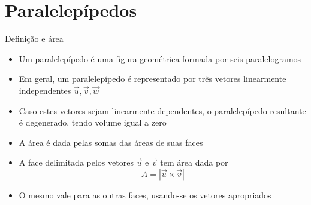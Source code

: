 \section{Paralelepípedos}

\begin{frame}[fragile]{Definição e área}

    \begin{itemize}
        \item Um paralelepípedo é uma figura geométrica formada por seis paralelogramos

        \item Em geral, um paralelepípedo é representado por três vetores linearmente 
            independentes $\vec{u}, \vec{v}, \vec{w}$

        \item Caso estes vetores sejam linearmente dependentes, o paralelepípedo resultante
            é degenerado, tendo volume igual a zero

        \item A área é dada pelas somas das áreas de suas faces

        \item A face delimitada pelos vetores $\vec{u}$ e $\vec{v}$ tem área dada por
        \[
            A = |\vec{u} \times \vec{v}|
        \]

        \item O mesmo vale para as outras faces, usando-se os vetores apropriados
    \end{itemize}

\end{frame}

